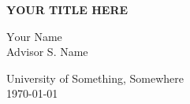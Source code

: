 


\begin{titlepage}

	\vspace*{2cm}
	\centering

	{\bfseries
		\Huge Y\huge OUR \Huge T\huge ITLE \Huge H\huge ERE
	}

	\vspace{3cm}
	{\large \textsc
		Your Name\\
		Advisor S. Name
	}

	\vfill
	University of Something, Somewhere\\
	\today
	
\end{titlepage}
